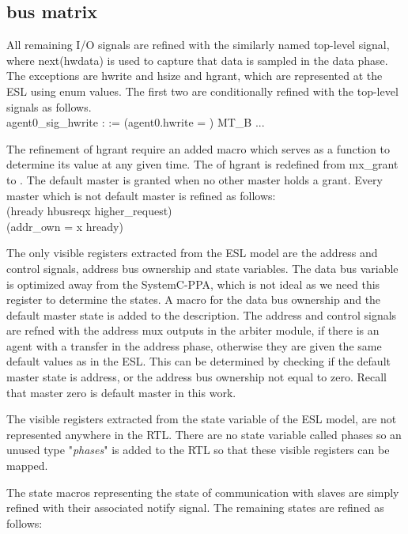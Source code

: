 \subsection{bus matrix}

All remaining I/O signals are refined with the similarly named top-level signal, where next(hwdata) is used to capture that data is sampled in the data phase. The exceptions are hwrite and hsize and hgrant, which are represented at the ESL using enum values. The first two are conditionally refined with the top-level signals as follows.\\   
 agent0\_sig\_hwrite :  := (agent0.hwrite = )  MT\_B ...\par
The refinement of hgrant require an added macro which serves as a function to determine its value at any given time. The  of hgrant is redefined from mx\_grant to . The default master is granted when no other master holds a grant. Every master which is not default master is refined as follows: \\
(hready  hbusreqx  higher\_request\ITLRW{)}) \\
(addr\_own = x hready\ITLKW{)})   \par
The only visible registers extracted from the ESL model are the address and control signals, address bus ownership and state variables. The data bus variable is optimized away from the SystemC-PPA, which is not ideal as we need this register to determine the states. A macro for the data bus ownership and the default master state is added to the description. The address and control signals are refned with the address mux outputs in the arbiter module, if there is an agent with a transfer in the address phase, otherwise they are given the same default values as in the ESL. This can be determined by checking if the default master state is address, or the address bus ownership not equal to zero. Recall that master zero is default master in this work. \par
The visible registers extracted from the state variable of the ESL model, are not represented anywhere in the RTL. There are no state variable called phases so an unused type "\textit{phases}" is added to the RTL so that these visible registers can be mapped. \par
The state macros representing the state of communication with slaves are simply refined with their associated notify signal. The remaining states are refined as follows: 
